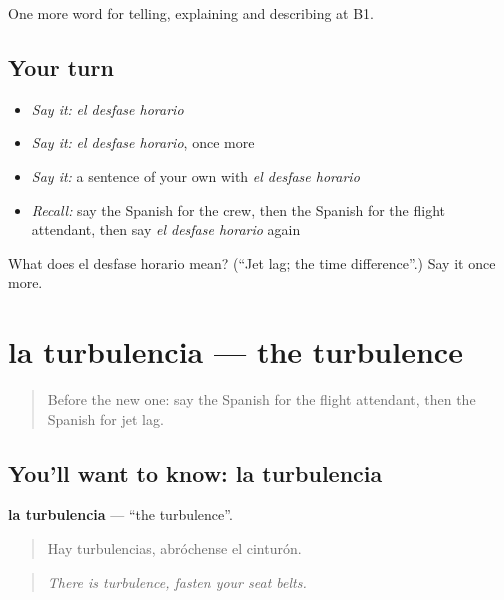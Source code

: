 \begin{grammarlens}[title={What you've built}]
One more word for telling, explaining and describing at B1.
\end{grammarlens}

\subsection*{Your turn}
\begin{itemize}
\raggedright
  \item \emph{Say it:} \emph{el desfase horario}
  \item \emph{Say it:} \emph{el desfase horario}, once more
  \item \emph{Say it:} a sentence of your own with \emph{el desfase horario}
  \item \emph{Recall:} say the Spanish for the crew, then the Spanish for the flight attendant, then say \emph{el desfase horario} again
\end{itemize}

\begin{tcolorbox}[breakable,colback=teal!4,colframe=teal!35!black,title={Before you move on}]
What does el desfase horario mean? (\textquotedblleft{}Jet lag; the time difference\textquotedblright{}.) Say it once more.
\end{tcolorbox}
\section[la turbulencia]{la turbulencia — the turbulence}

\label{lesson:ES-C655-turbulencia}



\begin{quote}
Before the new one: say the Spanish for the flight attendant, then the Spanish for jet lag.
\end{quote}

\subsection*{You'll want to know: la turbulencia}
\textbf{la turbulencia} — \textquotedblleft{}the turbulence\textquotedblright{}.

\begin{quote}
Hay turbulencias, abróchense el cinturón.
\end{quote}

\begin{quote}
\emph{There is turbulence, fasten your seat belts.}
\end{quote}

